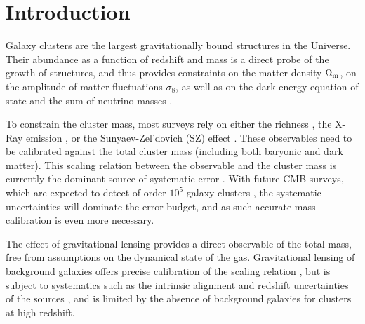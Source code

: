 \documentclass[prd, superscriptaddress, tightenlines, longbibliography, nofootinbib, eqsecnum, amsfonts, amsmath, floatfix, twocolumn, notitlepage]{revtex4-2}
\begin{document}
\section{Introduction}
\setcounter{footnote}{0}

Galaxy clusters are the largest gravitationally bound structures in the Universe. Their abundance as a function of redshift and mass is a direct probe of the growth of structures, and thus provides constraints on the matter density $\Omega_{\rm m}$, on the amplitude of matter fluctuations $\sigma_8$, as well as on the dark energy equation of state and the sum of neutrino masses \cite{Vikhlinin:2008ym,Sehgal:2010ca,Allen:2011zs,Planck:2013lkt, Mantz:2014xba,Mantz:2014paa, Planck:2015lwi,SPT:2016izt, SPT:2018njh, SPT:2021efh, Raghunathan:2021zfi}. 


To constrain the cluster mass, most surveys rely on either the richness \cite[e.g.][]{Koester:2007bj,DES:2015mqu,Andreon:2016eck, Farahi:2016xux,Simet:2016mzg}, the X-Ray emission \cite[e.g.][]{Arnaud:2005ur, Arnaud:2007br, Vikhlinin:2008ym}, or the Sunyaev-Zel'dovich (SZ) effect \cite[e.g.][]{Vanderlinde:2010eb, Planck:2013lkt,Planck:2015lwi}. These observables need to be calibrated against the total cluster mass (including both baryonic and dark matter).
This scaling relation between the observable and the cluster mass is currently the dominant source of systematic error \cite{Pratt:2019cnf, Salvati:2020exw, Salvati:2021gkt}.
With future CMB surveys, which are expected to detect of order $10^5$ galaxy clusters \cite{Madhavacheril:2017onh, SimonsObservatory:2018koc, CMB-S4:2016ple, Raghunathan:2021zfi}, the systematic uncertainties will dominate the error budget, and as such accurate mass calibration is even more necessary.

The effect of gravitational lensing provides a direct observable of the total mass, free from assumptions on the dynamical state of the gas.
Gravitational lensing of background galaxies offers precise calibration of the scaling relation \cite{vonderLinden:2014haa, Hoekstra:2015gda, Smith:2015qhs, Sereno:2017zcn, Penna-Lima:2016tvo, Bellagamba:2018gec,Miyatake:2018lpb, Umetsu:2020wlf}, but is subject to systematics such as the intrinsic alignment and redshift uncertainties of the sources \cite{Becker:2010xj}, and is limited by the absence of background galaxies for clusters at high redshift.
\end{document}
